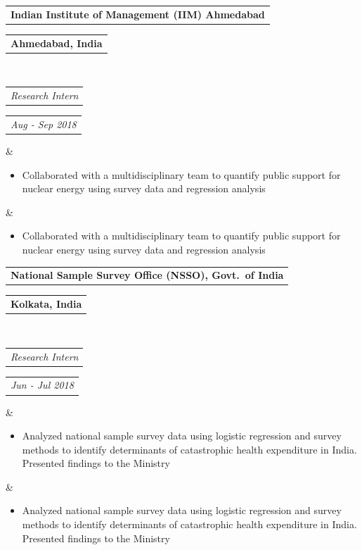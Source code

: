 \documentclass[11pt,a4paper,roman]{moderncv}        %
\makeatletter
\newcommand*{\customcventry}[7][.25em]{
  \begin{tabular}{@{}l}
    {\bfseries #4}
  \end{tabular}
  \hfill%
  \begin{tabular}{l@{}}
     {\bfseries #5}
  \end{tabular} \\
  \begin{tabular}{@{}l}
    {\itshape #3}
  \end{tabular}
  \hfill%
  \begin{tabular}{l@{}}
     {\itshape #2}
  \end{tabular}
  \ifx&#7&%
  \else\par\nobreak%
    {\small\noindent#7\par}\fi%
  \par\addvspace{#1}}
\newcommand{\keepentry}[1]{\par\noindent\begin{minipage}{\textwidth}#1\end{minipage}\par\addvspace{.25em}}
\makeatother
\begin{document}
\vspace{0.1cm}
\keepentry{\customcventry{Aug - Sep 2018}{Research Intern}{Indian Institute of Management (IIM) Ahmedabad}{Ahmedabad, India}{}
{\begin{itemize}
  \item Collaborated with a multidisciplinary team to quantify public support for nuclear energy using survey data and regression analysis
\end{itemize}
}}
\vspace{0.1cm}
\keepentry{\customcventry{Jun - Jul 2018}{Research Intern}{National Sample Survey Office (NSSO), Govt.\ of India}{Kolkata, India}{}
{\begin{itemize}
  \item Analyzed national sample survey data using logistic regression and survey methods to identify determinants of catastrophic health expenditure in India. Presented findings to the Ministry
\end{itemize}
}}

\end{document}
